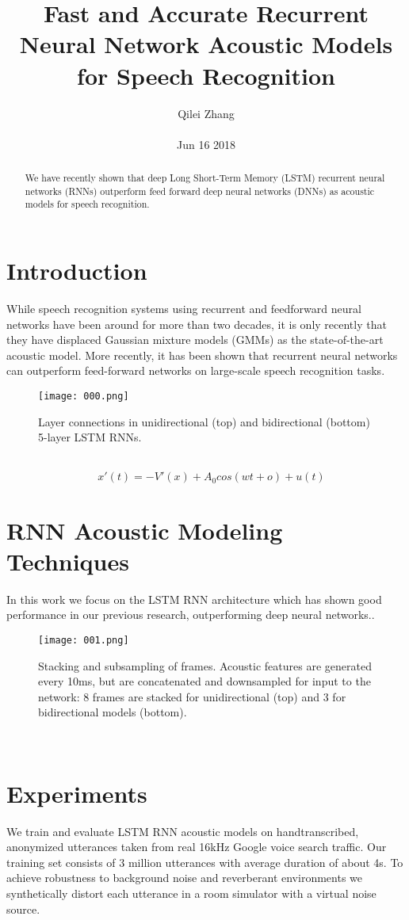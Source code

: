 \documentclass[30pt,twocolumn,letterpaper]{article}
\author{Qilei Zhang\\\\
Jun 16 2018}
\title{Fast and Accurate Recurrent Neural Network Acoustic Models for Speech Recognition}
\begin{document}
\maketitle
\begin{abstract}
  We have recently shown that deep Long Short-Term Memory (LSTM) recurrent neural networks (RNNs) outperform feed forward deep neural networks (DNNs) as acoustic models for speech recognition.
\end{abstract}
\section{Introduction}
While speech recognition systems using recurrent and feedforward neural networks have been around for more than two decades\cite{Barat2016String}, it is only recently that they have displaced Gaussian mixture models (GMMs) as the state-of-the-art acoustic model\cite{Eiber2013Attaining}. More recently, it has been shown that recurrent neural networks can outperform feed-forward networks on large-scale speech recognition tasks\cite{Krogh1995Neural}. \\
\begin{figure}[htbp]
\small
\centering
\texttt{[image: 000.png]}
\caption{Layer connections in unidirectional (top) and bidirectional
(bottom) 5-layer LSTM RNNs.}
\label{fig:lable}
\end{figure}\\
\begin{equation}
\quad x'(t)=-V'(x)+A_0cos(wt+o)+u(t)
\end{equation}
\section{RNN Acoustic Modeling Techniques}
In this work we focus on the LSTM RNN architecture which has shown good performance in our previous research, outperforming deep neural networks.\cite{Pustejovsky1998The}.\\
\begin{figure}[htbp]
\small
\centering
\texttt{[image: 001.png]}
\caption{Stacking and subsampling of frames. Acoustic features
are generated every 10ms, but are concatenated and downsampled
for input to the network: 8 frames are stacked for unidirectional
(top) and 3 for bidirectional models (bottom).
}
\label{fig:lable}
\end{figure}\\
\section{Experiments}
We train and evaluate LSTM RNN acoustic models on handtranscribed, anonymized utterances taken from real 16kHz Google voice search traffic\cite{Sanger1989Optimal}. Our training set consists of 3 million utterances with average duration of about 4s\cite{Szu1992Neural}. To achieve robustness to background noise and reverberant environments we synthetically distort each utterance in a room simulator with a virtual noise source\cite{Wittrock1989Generative}.
{\small


}
\end{document}
